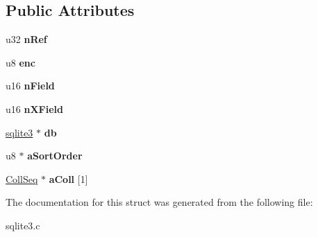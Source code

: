 \subsection*{Public Attributes}
\begin{DoxyCompactItemize}
\item 
u32 {\bfseries n\+Ref}\hypertarget{structKeyInfo_a4f6162c8d1ecc9e3c7471571e8918972}{}\label{structKeyInfo_a4f6162c8d1ecc9e3c7471571e8918972}

\item 
u8 {\bfseries enc}\hypertarget{structKeyInfo_a37972825f9a148668e979be12465e832}{}\label{structKeyInfo_a37972825f9a148668e979be12465e832}

\item 
u16 {\bfseries n\+Field}\hypertarget{structKeyInfo_af70436487a95e445d540bfc4ca1d3f0b}{}\label{structKeyInfo_af70436487a95e445d540bfc4ca1d3f0b}

\item 
u16 {\bfseries n\+X\+Field}\hypertarget{structKeyInfo_ac77a6b68f879a69127a8797b62a2f3aa}{}\label{structKeyInfo_ac77a6b68f879a69127a8797b62a2f3aa}

\item 
\hyperlink{structsqlite3}{sqlite3} $\ast$ {\bfseries db}\hypertarget{structKeyInfo_af2e7a3a411f5ca1ccf6de77d320b59db}{}\label{structKeyInfo_af2e7a3a411f5ca1ccf6de77d320b59db}

\item 
u8 $\ast$ {\bfseries a\+Sort\+Order}\hypertarget{structKeyInfo_ac5fe4bd0172a1f11f41f678528a7b21e}{}\label{structKeyInfo_ac5fe4bd0172a1f11f41f678528a7b21e}

\item 
\hyperlink{structCollSeq}{Coll\+Seq} $\ast$ {\bfseries a\+Coll} \mbox{[}1\mbox{]}\hypertarget{structKeyInfo_ad43aa024fca5a065e75d8e24b231adcb}{}\label{structKeyInfo_ad43aa024fca5a065e75d8e24b231adcb}

\end{DoxyCompactItemize}


The documentation for this struct was generated from the following file\+:\begin{DoxyCompactItemize}
\item 
sqlite3.\+c\end{DoxyCompactItemize}
